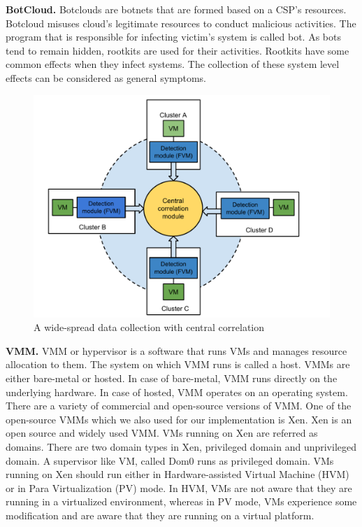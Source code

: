 \documentclass[conference]{IEEEtran}
\begin{document}
\textbf{BotCloud.}
Botclouds are botnets that are formed based on a CSP's resources. Botcloud misuses cloud's legitimate resources to conduct malicious activities. The program that is responsible for infecting victim's system is called bot. As bots tend to remain hidden, rootkits are used for their activities. Rootkits have some common effects when they infect systems. The collection of these system level effects can be considered as general symptoms.  

\begin{figure}
\begin{center}
\includegraphics[scale=0.5]{pic111.pdf}
\caption{A wide-spread data collection with central correlation}
\label{Fig:111}
\end{center}
\end{figure} 

\textbf{VMM.}
VMM or hypervisor is a software that runs VMs and manages resource allocation to them. The system on which VMM runs is called a host. VMMs are either bare-metal or hosted. In case of bare-metal, VMM runs directly on the underlying hardware. In case of hosted, VMM operates on an operating system. There are a variety of commercial and open-source versions of VMM. One of the open-source VMMs which we also used for our implementation  is Xen. Xen is an open source and widely used VMM. VMs running on Xen are referred as domains. There are two domain types in Xen, privileged domain and unprivileged domain. A supervisor like VM, called Dom0 runs as privileged domain. VMs running on Xen should run either in Hardware-assisted Virtual Machine (HVM) or in Para Virtualization (PV) mode. In HVM, VMs are not aware that they are running in a virtualized environment, whereas in PV mode, VMs experience some modification and are aware that they are running on a virtual platform. 
\end{document}

